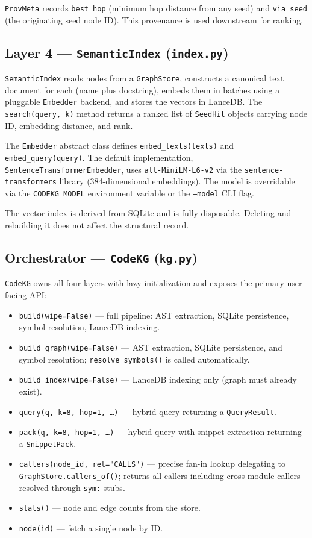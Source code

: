 \documentclass[10pt]{article}
\begin{document}
\texttt{ProvMeta} records \texttt{best\_hop} (minimum hop distance from any seed)
and \texttt{via\_seed} (the originating seed node ID). This provenance is used
downstream for ranking.

\subsection{Layer 4 --- \texttt{SemanticIndex} (\texttt{index.py})}

\texttt{SemanticIndex} reads nodes from a \texttt{GraphStore}, constructs a
canonical text document for each (name plus docstring), embeds them in batches
using a pluggable \texttt{Embedder} backend, and stores the vectors in LanceDB.
The \texttt{search(query, k)} method returns a ranked list of \texttt{SeedHit}
objects carrying node ID, embedding distance, and rank.

The \texttt{Embedder} abstract class defines \texttt{embed\_texts(texts)} and
\texttt{embed\_query(query)}. The default implementation,
\texttt{SentenceTransformerEmbedder}, uses \texttt{all-MiniLM-L6-v2}
via the \texttt{sentence-transformers} library (384-dimensional embeddings).
The model is overridable via the \texttt{CODEKG\_MODEL} environment variable or
the \texttt{--model} CLI flag.

The vector index is derived from SQLite and is fully disposable. Deleting and
rebuilding it does not affect the structural record.

\subsection{Orchestrator --- \texttt{CodeKG} (\texttt{kg.py})}

\texttt{CodeKG} owns all four layers with lazy initialization and exposes the
primary user-facing API:

\begin{itemize}
\item \texttt{build(wipe=False)} --- full pipeline: AST extraction, SQLite
persistence, symbol resolution, LanceDB indexing.
\item \texttt{build\_graph(wipe=False)} --- AST extraction, SQLite persistence,
and symbol resolution; \texttt{resolve\_symbols()} is called automatically.
\item \texttt{build\_index(wipe=False)} --- LanceDB indexing only (graph must
already exist).
\item \texttt{query(q, k=8, hop=1, \ldots)} --- hybrid query returning a
\texttt{QueryResult}.
\item \texttt{pack(q, k=8, hop=1, \ldots)} --- hybrid query with snippet extraction
returning a \texttt{SnippetPack}.
\item \texttt{callers(node\_id, rel="CALLS")} --- precise fan-in lookup delegating
to \texttt{GraphStore.callers\_of()}; returns all callers including cross-module
callers resolved through \texttt{sym:} stubs.
\item \texttt{stats()} --- node and edge counts from the store.
\item \texttt{node(id)} --- fetch a single node by ID.
\end{itemize}
\end{document}
